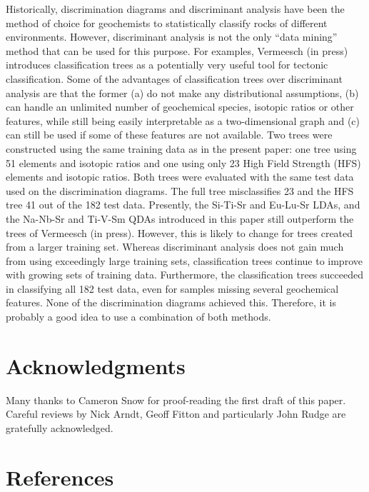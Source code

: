 \documentclass{article}
\begin{document}
Historically, discrimination  diagrams and discriminant  analysis have
been the  method of choice  for geochemists to  statistically classify
rocks of different environments. However, discriminant analysis is not
the only ``data mining'' method that can be used for this purpose. For
examples, Vermeesch  (in press)  introduces classification trees  as a
potentially very useful tool  for tectonic classification. Some of the
advantages of classification trees over discriminant analysis are that
the former  (a) do  not make any  distributional assumptions,  (b) can
handle an unlimited number  of geochemical species, isotopic ratios or
other  features,   while  still   being  easily  interpretable   as  a
two-dimensional  graph and  (c) can  still be  used if  some  of these
features are not available.  Two trees were constructed using the same
training data as in the present  paper: one tree using 51 elements and
isotopic  ratios and  one  using  only 23  High  Field Strength  (HFS)
elements and isotopic ratios.  Both trees were evaluated with the same
test  data  used  on  the  discrimination  diagrams.   The  full  tree
misclassifies  23 and  the  HFS tree  41  out of  the  182 test  data.
Presently,  the  Si-Ti-Sr and  Eu-Lu-Sr  LDAs,  and  the Na-Nb-Sr  and
Ti-V-Sm QDAs  introduced in this  paper still outperform the  trees of
Vermeesch (in  press).  However,  this is likely  to change  for trees
created  from a  larger training  set.  Whereas  discriminant analysis
does  not  gain  much  from  using exceedingly  large  training  sets,
classification trees continue to improve with growing sets of training
data.  Furthermore, the  classification trees succeeded in classifying
all  182  test data,  even  for  samples  missing several  geochemical
features.   None   of  the  discrimination   diagrams  achieved  this.
Therefore, it  is probably a  good idea to  use a combination  of both
methods.

\section*{Acknowledgments}

Many thanks to Cameron Snow  for proof-reading the first draft of this
paper. Careful  reviews by Nick  Arndt, Geoff Fitton  and particularly
John Rudge are gratefully acknowledged.

\section*{References}
\end{document}
